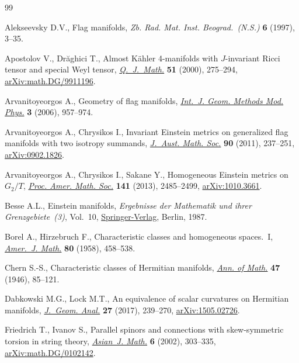 \documentclass[10pt,a4paper]{amsart}
\numberwithin{equation}{section}
\begin{document}
\begin{thebibliography}{99}
\footnotesize\itemsep=0pt

Alekseevsky D.V., Flag manifolds, \textit{Zb. Rad. Mat. Inst. Beograd.~(N.S.)}
 \textbf{6} (1997), 3--35.

Apostolov V., Dr\u{a}ghici T., Almost {K}\"ahler 4-manifolds with
 {$J$}-invariant {R}icci tensor and special {W}eyl tensor,
 \href{https://doi.org/10.1093/qjmath/51.3.275}{\textit{Q.~J.~Math.}} \textbf{51} (2000), 275--294, \href{https://arxiv.org/abs/math.DG/9911196}{arXiv:math.DG/9911196}.

Arvanitoyeorgos A., Geometry of flag manifolds, \href{https://doi.org/10.1142/S0219887806001399}{\textit{Int.~J. Geom. Methods
 Mod. Phys.}} \textbf{3} (2006), 957--974.

Arvanitoyeorgos A., Chrysikos I., Invariant {E}instein metrics on generalized
 flag manifolds with two isotropy summands, \href{https://doi.org/10.1017/S1446788711001303}{\textit{J.~Aust. Math. Soc.}}
 \textbf{90} (2011), 237--251, \href{https://arxiv.org/abs/0902.1826}{arXiv:0902.1826}.

Arvanitoyeorgos A., Chrysikos I., Sakane Y., Homogeneous {E}instein metrics on
 {$G_2/T$}, \href{https://doi.org/10.1090/S0002-9939-2013-11682-5}{\textit{Proc. Amer. Math. Soc.}} \textbf{141} (2013), 2485--2499,
 \href{https://arxiv.org/abs/1010.3661}{arXiv:1010.3661}.

Besse A.L., Einstein manifolds, \textit{Ergebnisse der Mathematik und ihrer
 Grenzgebiete~(3)}, Vol.~10, \href{https://doi.org/10.1007/978-3-540-74311-8}{Springer-Verlag}, Berlin, 1987.

Borel A., Hirzebruch F., Characteristic classes and homogeneous spaces.~{I},
 \href{https://doi.org/10.2307/2372795}{\textit{Amer.~J. Math.}} \textbf{80} (1958), 458--538.

Chern S.-S., Characteristic classes of {H}ermitian manifolds, \href{https://doi.org/10.2307/1969037}{\textit{Ann. of
 Math.}} \textbf{47} (1946), 85--121.

Dabkowski M.G., Lock M.T., An equivalence of scalar curvatures on {H}ermitian
 manifolds, \href{https://doi.org/10.1007/s12220-016-9680-4}{\textit{J.~Geom. Anal.}} \textbf{27} (2017), 239--270,
 \href{https://arxiv.org/abs/1505.02726}{arXiv:1505.02726}.

Friedrich T., Ivanov S., Parallel spinors and connections with skew-symmetric
 torsion in string theory, \href{https://doi.org/10.4310/AJM.2002.v6.n2.a5}{\textit{Asian~J. Math.}} \textbf{6} (2002),
 303--335, \href{https://arxiv.org/abs/math.DG/0102142}{arXiv:math.DG/0102142}.


\end{thebibliography}
\end{document}
